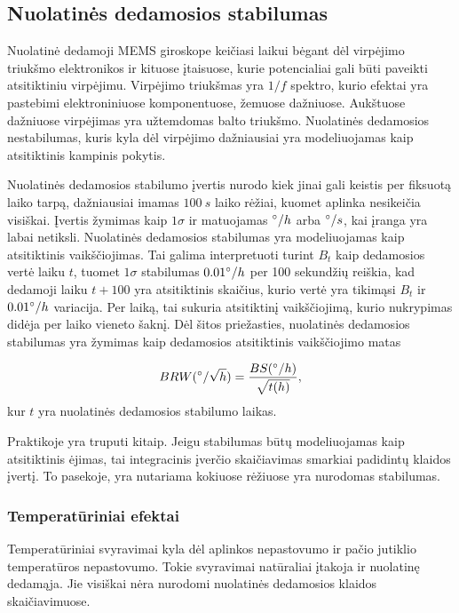 \subsection{Nuolatinės dedamosios stabilumas}

Nuolatinė dedamoji MEMS giroskope keičiasi laikui bėgant dėl virpėjimo triukšmo elektronikos ir kituose įtaisuose, kurie potencialiai gali būti paveikti atsitiktiniu virpėjimu. Virpėjimo triukšmas yra $1/f$ spektro, kurio efektai yra pastebimi elektroniniuose komponentuose, žemuose dažniuose. Aukštuose dažniuose virpėjimas yra užtemdomas balto triukšmo. Nuolatinės dedamosios nestabilumas, kuris kyla dėl virpėjimo dažniausiai yra modeliuojamas kaip atsitiktinis kampinis pokytis.

Nuolatinės dedamosios stabilumo įvertis nurodo kiek jinai gali keistis per fiksuotą laiko tarpą, dažniausiai imamas $100~s$ laiko rėžiai, kuomet aplinka nesikeičia visiškai. Įvertis žymimas kaip $1\sigma$ ir matuojamas $\degree/h$ arba $\degree/s$, kai įranga yra labai netiksli. Nuolatinės dedamosios stabilumas yra modeliuojamas kaip atsitiktinis vaikščiojimas. Tai galima interpretuoti turint $B_t$ kaip dedamosios vertė laiku $t$, tuomet $1\sigma$ stabilumas $0.01\degree/h$ per 100 sekundžių reiškia, kad dedamoji laiku $t+100$ yra atsitiktinis skaičius, kurio vertė yra tikimąsi $B_t$ ir $0.01\degree/h$ variacija. Per laiką, tai sukuria atsitiktinį vaikščiojimą, kurio nukrypimas didėja per laiko vieneto šaknį. Dėl šitos priežasties, nuolatinės dedamosios stabilumas yra žymimas kaip dedamosios atsitiktinis vaikščiojimo matas

\begin{equation}
    BRW (\degree / \sqrt{h}) = \frac{BS(\degree/h)}{\sqrt{t(h)}},
\end{equation}
kur $t$ yra nuolatinės dedamosios stabilumo laikas.

Praktikoje yra truputi kitaip. Jeigu stabilumas būtų modeliuojamas kaip atsitiktinis ėjimas, tai integracinis įverčio skaičiavimas smarkiai padidintų klaidos įvertį. To pasekoje, yra nutariama kokiuose rėžiuose yra nurodomas stabilumas.

\subsubsection{Temperatūriniai efektai}

Temperatūriniai svyravimai kyla dėl aplinkos nepastovumo ir pačio jutiklio temperatūros nepastovumo. Tokie svyravimai natūraliai įtakoja ir nuolatinę dedamąja. Jie visiškai nėra nurodomi nuolatinės dedamosios klaidos skaičiavimuose.

